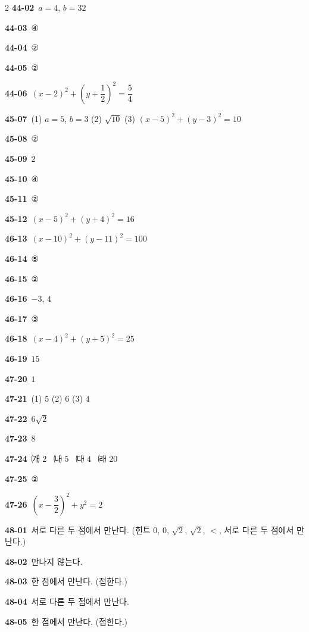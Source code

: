 \documentclass[10pt,a4paper]{article}
\begin{document}
\begin{multicols}{2}
\noindent\textbf{44-02}\ $a=4$, $b=32$\par
\noindent\textbf{44-03}\ ④\par
\noindent\textbf{44-04}\ ②\par
\noindent\textbf{44-05}\ ②\par
\noindent\textbf{44-06}\ $(x-2)^2+\left(y+\dfrac{1}{2}\right)^2=\dfrac{5}{4}$\par
\noindent\textbf{45-07}\ (1) $a=5$, $b=3$ (2) $\sqrt{10}$ (3) $(x-5)^2+(y-3)^2=10$\par
\noindent\textbf{45-08}\ ②\par
\noindent\textbf{45-09}\ $2$\par
\noindent\textbf{45-10}\ ④\par
\noindent\textbf{45-11}\ ②\par
\noindent\textbf{45-12}\ $(x-5)^2+(y+4)^2=16$\par
\noindent\textbf{46-13}\ $(x-10)^2+(y-11)^2=100$\par
\noindent\textbf{46-14}\ ⑤\par
\noindent\textbf{46-15}\ ②\par
\noindent\textbf{46-16}\ $-3$, $4$\par
\noindent\textbf{46-17}\ ③\par
\noindent\textbf{46-18}\ $(x-4)^2+(y+5)^2=25$\par
\noindent\textbf{46-19}\ $15$\par
\noindent\textbf{47-20}\ $1$\par
\noindent\textbf{47-21}\ (1) $5$ (2) $6$ (3) $4$\par
\noindent\textbf{47-22}\ $6\sqrt{2}$\par
\noindent\textbf{47-23}\ $8$\par
\noindent\textbf{47-24}\ ㈎ $2$ \ ㈏ $5$ \ ㈐ $4$ \ ㈑ $20$\par
\noindent\textbf{47-25}\ ②\par
\noindent\textbf{47-26}\ $\left(x-\dfrac{3}{2}\right)^2+y^2=2$\par
\noindent\textbf{48-01}\ 서로 다른 두 점에서 만난다. (힌트 $0$, $0$, $\sqrt{2}$, $\sqrt{2}$, $<$, 서로 다른 두 점에서 만난다.)\par
\noindent\textbf{48-02}\ 만나지 않는다.\par
\noindent\textbf{48-03}\ 한 점에서 만난다. (접한다.)\par
\noindent\textbf{48-04}\ 서로 다른 두 점에서 만난다.\par
\noindent\textbf{48-05}\ 한 점에서 만난다. (접한다.)\par

\end{multicols}
\end{document}
